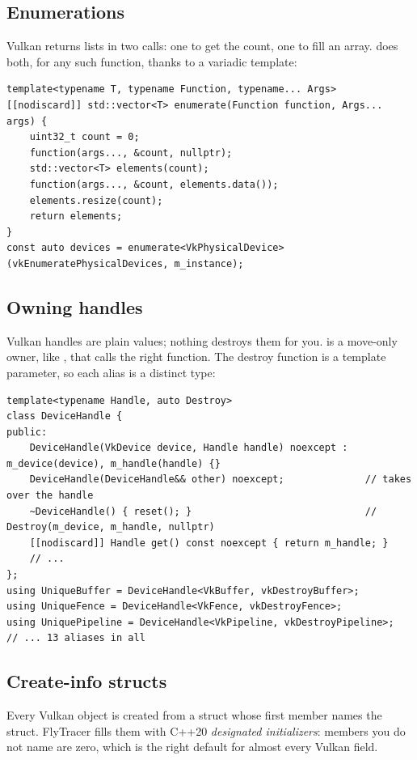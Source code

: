\documentclass[11pt,a4paper]{article}
\begin{document}
\subsection{Enumerations}

Vulkan returns lists in two calls: one to get the count, one to fill an array.  does both, for any such function, thanks to a variadic template:

\begin{lstlisting}
template<typename T, typename Function, typename... Args>
[[nodiscard]] std::vector<T> enumerate(Function function, Args... args) {
    uint32_t count = 0;
    function(args..., &count, nullptr);
    std::vector<T> elements(count);
    function(args..., &count, elements.data());
    elements.resize(count);
    return elements;
}
const auto devices = enumerate<VkPhysicalDevice>(vkEnumeratePhysicalDevices, m_instance);
\end{lstlisting}

\subsection{Owning handles}

Vulkan handles are plain values; nothing destroys them for you.  is a move-only owner, like , that calls the right  function. The destroy function is a template parameter, so each alias is a distinct type:

\begin{lstlisting}
template<typename Handle, auto Destroy>
class DeviceHandle {
public:
    DeviceHandle(VkDevice device, Handle handle) noexcept : m_device(device), m_handle(handle) {}
    DeviceHandle(DeviceHandle&& other) noexcept;              // takes over the handle
    ~DeviceHandle() { reset(); }                              // Destroy(m_device, m_handle, nullptr)
    [[nodiscard]] Handle get() const noexcept { return m_handle; }
    // ...
};
using UniqueBuffer = DeviceHandle<VkBuffer, vkDestroyBuffer>;
using UniqueFence = DeviceHandle<VkFence, vkDestroyFence>;
using UniquePipeline = DeviceHandle<VkPipeline, vkDestroyPipeline>;
// ... 13 aliases in all
\end{lstlisting}

\subsection{Create-info structs}

Every Vulkan object is created from a  struct whose first member  names the struct. FlyTracer fills them with C++20 \emph{designated initializers}: members you do not name are zero, which is the right default for almost every Vulkan field.
\end{document}
